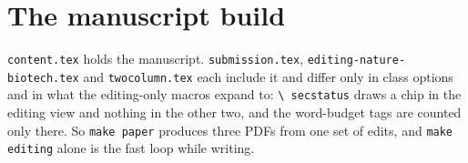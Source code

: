 
\section{The manuscript build}
\label{sec:manuscript}


\texttt{content.tex} holds the manuscript. \texttt{submission.tex},
\texttt{editing-nature-biotech.tex} and \texttt{twocolumn.tex} each include it and differ only in
class options and in what the editing-only macros expand to: \texttt{\textbackslash
secstatus} draws a chip in the editing view and nothing in the other two, and the
word-budget tags are counted only there. So \texttt{make paper} produces three PDFs
from one set of edits, and \texttt{make editing} alone is the fast loop while
writing.

